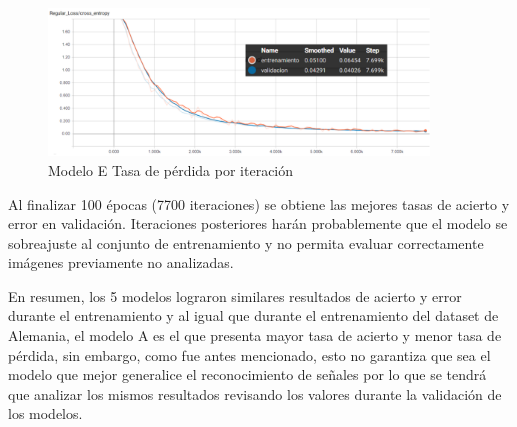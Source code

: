			\begin{figure}[H]
				\begin{center}
				\includegraphics[width=0.9\textwidth]{images/desarrollo/trainResults/peru/modelELoss} 
				\end{center}
				\begin{center}
				\caption{\small{Modelo E Tasa de pérdida por iteración}}
				
				{\small{\fontsize{10}{16.8}\selectfont {Fuente: Elaboración propia}}}
				\end{center}
				\vspace{-1.5em}
			\end{figure}
		
			Al finalizar 100 épocas (7700 iteraciones) se obtiene las mejores tasas de acierto y error en validación. Iteraciones posteriores harán probablemente que el modelo se sobreajuste al conjunto de entrenamiento y no permita evaluar correctamente imágenes previamente no analizadas.


		En resumen, los 5 modelos lograron similares resultados de acierto y error durante el entrenamiento y al igual que durante el entrenamiento del dataset de Alemania, el modelo A es el que presenta mayor tasa de acierto y menor tasa de pérdida, sin embargo, como fue antes mencionado, esto no garantiza que sea el modelo que mejor generalice el reconocimiento de señales por lo que se tendrá que analizar los mismos resultados revisando los valores durante la validación de los modelos.

